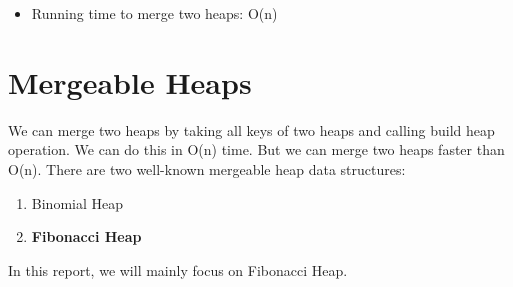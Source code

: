 \documentclass[14pt,a4paper]{report}
\begin{document}
\begin{itemize}
    \item Running time to merge two heaps: O(n)
\end{itemize}

\chapter{Mergeable Heaps}
We can merge two heaps by taking all keys of two heaps and calling build heap operation. We can do this in O(n) time. But we can merge two heaps faster than O(n). There are two well-known mergeable heap data structures:
\begin{enumerate}
    \item Binomial Heap
    \item \textbf{Fibonacci Heap}
\end{enumerate}
In this report, we will mainly focus on Fibonacci Heap.
\end{document}

